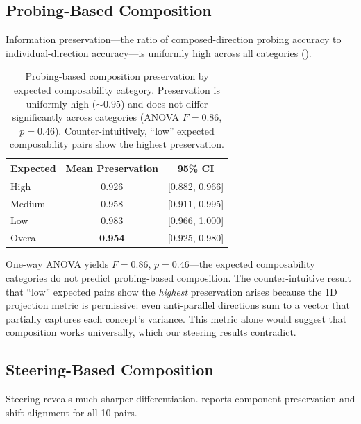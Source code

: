 \subsection{Probing-Based Composition}
\label{sec:probing_results}

Information preservation---the ratio of composed-direction probing accuracy to
individual-direction accuracy---is uniformly high across all categories
().

\begin{table}[t]
    \centering
    \caption{Probing-based composition preservation by expected composability
    category. Preservation is uniformly high (${\sim}0.95$) and does not
    differ significantly across categories (ANOVA $F = 0.86$, $p = 0.46$).
    Counter-intuitively, ``low'' expected composability pairs show the
    highest preservation.}
    \begin{tabular}{@{}lcc@{}}
        \toprule
        \textbf{Expected} & \textbf{Mean Preservation} & \textbf{95\% CI} \\
        \midrule
        High   & 0.926 & [0.882, 0.966] \\
        Medium & 0.958 & [0.911, 0.995] \\
        Low    & 0.983 & [0.966, 1.000] \\
        \midrule
        Overall & \textbf{0.954} & [0.925, 0.980] \\
        \bottomrule
    \end{tabular}
    \label{tab:probing_composition}
\end{table}

One-way ANOVA yields $F = 0.86$, $p = 0.46$---the expected composability
categories do not predict probing-based composition. The counter-intuitive
result that ``low'' expected pairs show the \emph{highest} preservation arises
because the 1D projection metric is permissive: even anti-parallel directions
sum to a vector that partially captures each concept's variance. This metric
alone would suggest that composition works universally, which our steering
results contradict.

\subsection{Steering-Based Composition}
\label{sec:steering_results}

Steering reveals much sharper differentiation.  reports
component preservation and shift alignment for all 10 pairs.

